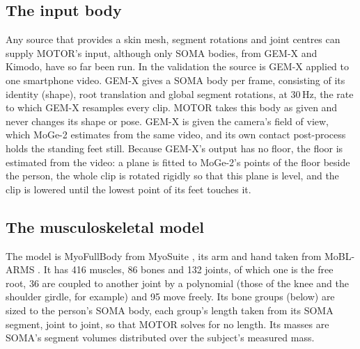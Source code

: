 \documentclass[11pt]{article}
\begin{document}
\subsection{The input body}

Any source that provides a skin mesh, segment rotations and joint centres can supply MOTOR's input, although only
SOMA bodies, from GEM-X and Kimodo, have so far been run. In the validation the source is GEM-X
\cite{gemx,li2025genmo} applied to one smartphone video. GEM-X gives a SOMA body \cite{saito2026soma} per frame,
consisting of its identity (shape), root translation and global segment rotations, at 30\,Hz, the rate to which
GEM-X resamples every clip. MOTOR takes this body as given and never changes its shape or pose. GEM-X is given the
camera's field of view, which MoGe-2 \cite{wang2025moge2} estimates from the same video, and its own contact
post-process holds the standing feet still. Because GEM-X's output has no floor, the floor is estimated from the
video: a plane is fitted to MoGe-2's points of the floor beside the person, the whole clip is rotated rigidly so that
this plane is level, and the clip is lowered until the lowest point of its feet touches it.

\subsection{The musculoskeletal model}

The model is MyoFullBody from MyoSuite \cite{caggiano2022myosuite}, its arm and hand taken from MoBL-ARMS
\cite{holzbaur2005upper,saul2015benchmarking}. It has 416 muscles, 86 bones and 132 joints, of which one is the free
root, 36 are coupled to another joint by a polynomial (those of the knee and the shoulder girdle, for example) and 95
move freely. Its bone groups (below) are sized to the person's SOMA body, each group's length taken from its SOMA
segment, joint to joint, so that MOTOR solves for no length. Its masses are SOMA's segment volumes distributed over the
subject's measured mass.
\end{document}
